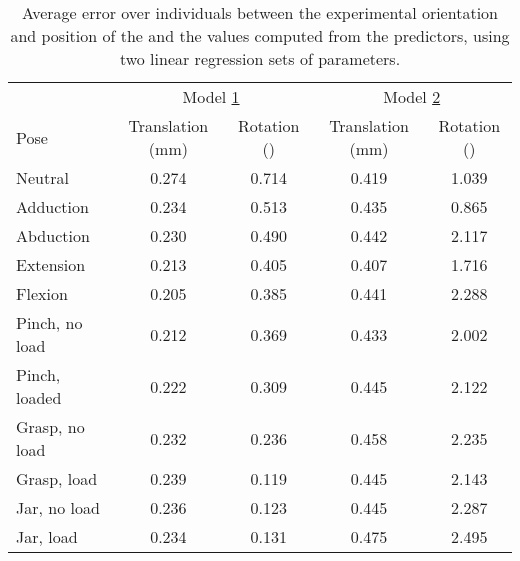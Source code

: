 \begin{table}[!ht]
	\centering
	\begin{tabular}{lcc|cc}
		\toprule
		\ham* & \multicolumn{2}{c}{Model \hyperref[model1]{1}} & \multicolumn{2}{c}{Model \hyperref[model2]{2}} \\
		Pose & Translation (mm) & Rotation (\degre) & Translation (mm) & Rotation (\degre) \\
		\midrule
		Neutral 	 	 & 0.274 	 & 0.714 	 & 0.419 	 & 1.039 \\
		Adduction 	 	 & 0.234 	 & 0.513 	 & 0.435 	 & 0.865 \\
		Abduction 	 	 & 0.230 	 & 0.490 	 & 0.442 	 & 2.117 \\
		Extension 	  	 & 0.213 	 & 0.405 	 & 0.407 	 & 1.716 \\
		Flexion 		 & 0.205 	 & 0.385 	 & 0.441 	 & 2.288 \\
		Pinch, no load 	 & 0.212 	 & 0.369 	 & 0.433 	 & 2.002 \\
		Pinch, loaded 	 & 0.222 	 & 0.309 	 & 0.445 	 & 2.122 \\
		Grasp, no load 	 & 0.232 	 & 0.236 	 & 0.458 	 & 2.235 \\
		Grasp, load 	 & 0.239 	 & 0.119 	 & 0.445 	 & 2.143 \\
		Jar, no load 	 & 0.236 	 & 0.123 	 & 0.445 	 & 2.287 \\
		Jar, load 		 & 0.234 	 & 0.131 	 & 0.475 	 & 2.495 \\
		\bottomrule
	\end{tabular}
	\caption[Generalization capacity of the statistical movement model for the \ham*]{Average error over individuals between the experimental orientation and position of the \ham* and the values computed from the predictors, using two linear regression sets of parameters.}
	\label{tab:linreg_ham}
\end{table}


